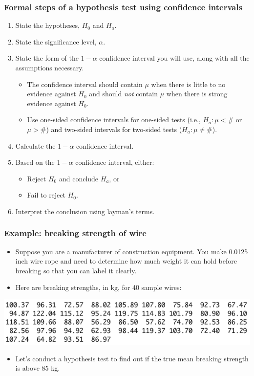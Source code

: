 \documentclass[handout]{beamer}\usepackage{graphicx, color}
\numberwithin{equation}{section}
\begin{document}
\begin{frame}
\frametitle{Formal steps of a hypothesis test using confidence intervals}
\begin{enumerate}[1. ]
\item State the hypotheses, $H_0$ and $H_a$.
\pause \item State the significance level, $\alpha$.
\pause \item State the form of the $1 - \alpha$ confidence interval you will use, along with all the assumptions necessary. 
\begin{itemize}
\item The confidence interval should contain $\mu$ when there is little to no evidence against $H_0$ and should \emph{not} contain $\mu$ when there is strong evidence against $H_0$. 
\item Use one-sided confidence intervals for one-sided tests (i.e., $H_a: \mu < \#$ or $\mu > \#$) and two-sided intervals for two-sided tests ($H_a: \mu \ne \#$).
\end{itemize}
\pause \item Calculate the $1 - \alpha$ confidence interval.
\pause \item Based on the $1 - \alpha$ confidence interval, either:
\begin{itemize}
\pause \item Reject $H_0$ and conclude $H_a$, or
\pause \item Fail to reject $H_0$.
\end{itemize}
\pause \item Interpret the conclusion using layman's terms.
\end{enumerate}
\end{frame}


\begin{frame}
\frametitle{Example: breaking strength of wire}
\begin{itemize}
\item Suppose you are a manufacturer of construction equipment. You make 0.0125 inch wire rope and need to determine how much weight it can hold before breaking so that you can label it clearly.
\pause \item Here are breaking strengths, in kg, for 40 sample wires:
\end{itemize}
 \includegraphics{../../fig/wiredata.png}
\begin{itemize}
\pause \item Let's conduct a hypothesis test to find out if the true mean breaking strength is above 85 kg.
\end{itemize}
\end{frame}
\end{document}
